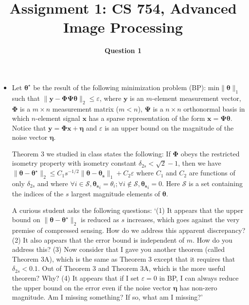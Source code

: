 \documentclass[12pt]{article}
\title{Assignment 1: CS 754, Advanced Image Processing}
\author{\textbf{Question 1}}
\date{}
\begin{document}
\maketitle

\begin{itemize}
    \item Let $\boldsymbol{\theta^{\star}}$ be the result of the following minimization problem (BP): $\textrm{min} \|\boldsymbol{\theta}\|_1$ such that $\|\boldsymbol{y}-\boldsymbol{\Phi \Psi \theta}\|_2 \leq \varepsilon$, where $\boldsymbol{y}$ is an $m$-element measurement vector, $\boldsymbol{\Phi}$ is a $m \times n$ measurement matrix ($m < n$), $\boldsymbol{\Psi}$ is a $n \times n$ orthonormal basis in which $n$-element signal $\boldsymbol{x}$ has a sparse representation of the form $\boldsymbol{x} = \boldsymbol{\Psi \theta}$. Notice that $\boldsymbol{y} = \boldsymbol{\Phi x} + \boldsymbol{\eta}$ and $\varepsilon$ is an upper bound on the magnitude of the noise vector $\boldsymbol{\eta}$.

Theorem 3 we studied in class states the following: If $\boldsymbol{\Phi}$ obeys the restricted isometry property with isometry constant $\delta_{2s} < \sqrt{2}-1$, then we have $\|\boldsymbol{\theta} - \boldsymbol{\theta^{\star}}\|_2 \leq C_1 s^{-1/2}\|\boldsymbol{\theta}-\boldsymbol{\theta_s}\|_1 + C_2 \varepsilon$ where $C_1$ and $C_2$ are functions of only $\delta_{2s}$ and where $\forall i \in \mathcal{S}, \boldsymbol{\theta_s}_i = \theta_i; \forall i \notin \mathcal{S}, \boldsymbol{\theta_s}_i = 0$. Here $\mathcal{S}$ is a set containing the indices of the $s$ largest magnitude elements of $\boldsymbol{\theta}$. 

A curious student asks the following questions: `(1) It appears that the upper bound on $\|\boldsymbol{\theta} - \boldsymbol{\theta^{\star}}\|_2$ is reduced as $s$ increases, which goes against the very premise of compressed sensing. How do we address this apparent discrepancy? (2) It also appears that the error bound is independent of $m$. How do you address this? (3) Now consider that I gave you another theorem (called Theorem 3A), which is the same as Theorem 3 except that it requires that $\delta_{2s} < 0.1$. Out of Theorem 3 and Theorem 3A, which is the more useful theorem? Why? (4) It appears that if I set $\varepsilon = 0$ in BP, I can always reduce the upper bound on the error even if the noise vector $\boldsymbol{\eta}$ has non-zero magnitude. Am I missing something? If so, what am I missing?'
\end{itemize}
\vspace*{0.5cm}\\
\end{document}
